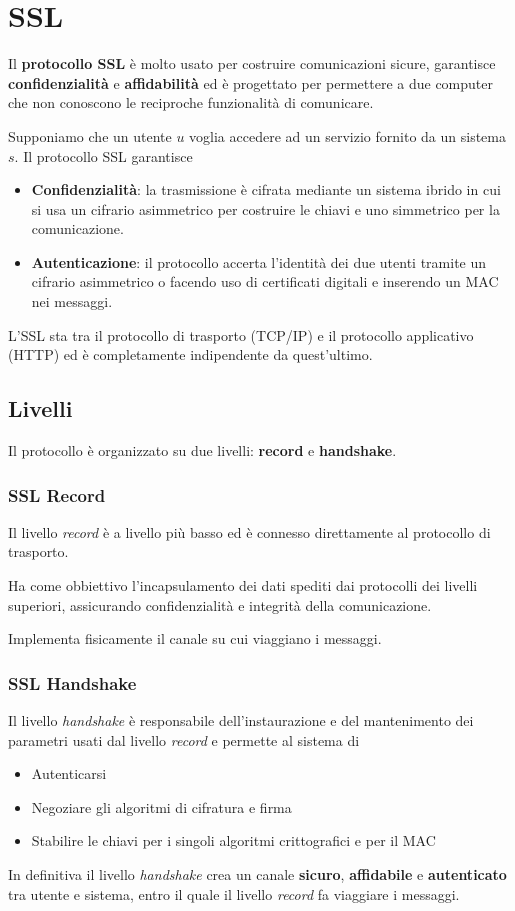\section{SSL}
Il \textbf{protocollo SSL} \`e molto usato per costruire comunicazioni sicure, garantisce \textbf{confidenzialit\`a}
e \textbf{affidabilit\`a} ed \`e progettato per permettere a due computer che non conoscono le reciproche
funzionalit\`a di comunicare.

Supponiamo che un utente $u$ voglia accedere ad un servizio fornito da un sistema $s$. Il protocollo SSL garantisce
\begin{itemize}
	\item \textbf{Confidenzialit\`a}: la trasmissione \`e cifrata mediante un sistema ibrido in cui si usa un
	      cifrario asimmetrico per costruire le chiavi e uno simmetrico per la comunicazione.
	\item \textbf{Autenticazione}: il protocollo accerta l'identit\`a dei due utenti tramite un cifrario asimmetrico
	      o facendo uso di certificati digitali e inserendo un MAC nei messaggi.
\end{itemize}
L'SSL sta tra il protocollo di trasporto (TCP/IP) e il protocollo applicativo (HTTP) ed \`e completamente
indipendente da quest'ultimo.

\subsection{Livelli}
Il protocollo \`e organizzato su due livelli: \textbf{record} e \textbf{handshake}.

\subsubsection{SSL Record}
Il livello \emph{record} \`e a livello pi\`u basso ed \`e connesso direttamente al protocollo di trasporto.

Ha come obbiettivo l'incapsulamento dei dati spediti dai protocolli dei livelli superiori, assicurando
confidenzialit\`a e integrit\`a della comunicazione.

Implementa fisicamente il canale su cui viaggiano i messaggi.

\subsubsection{SSL Handshake}
Il livello \emph{handshake} \`e responsabile dell'instaurazione e del mantenimento dei parametri usati dal livello
\emph{record} e permette al sistema di
\begin{itemize}
	\item Autenticarsi
	\item Negoziare gli algoritmi di cifratura e firma
	\item Stabilire le chiavi per i singoli algoritmi crittografici e per il MAC
\end{itemize}
In definitiva il livello \emph{handshake} crea un canale \textbf{sicuro}, \textbf{affidabile} e \textbf{autenticato}
tra utente e sistema, entro il quale il livello \emph{record} fa viaggiare i messaggi.

